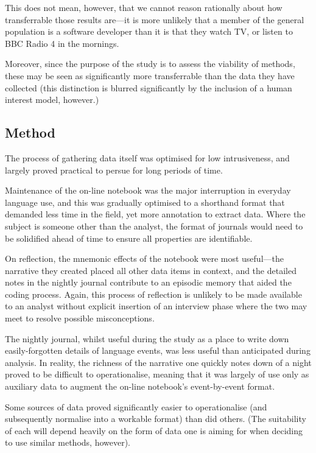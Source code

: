 This does not mean, however, that we cannot reason rationally about how transferrable those results are---it is more unlikely that a member of the general population is a software developer than it is that they watch TV, or listen to BBC Radio 4 in the mornings.

Moreover, since the purpose of the study is to assess the viability of methods, these may be seen as significantly more transferrable than the data they have collected (this distinction is blurred significantly by the inclusion of a human interest model, however.)






\subsection{Method}
The process of gathering data itself was optimised for low intrusiveness, and largely proved practical to persue for long periods of time.

Maintenance of the on-line notebook was the major interruption in everyday language use, and this was gradually optimised to a shorthand format that demanded less time in the field, yet more annotation to extract data.  Where the subject is someone other than the analyst, the format of journals would need to be solidified ahead of time to ensure all properties are identifiable.

On reflection, the mnemonic effects of the notebook were most useful---the narrative they created placed all other data items in context, and the detailed notes in the nightly journal contribute to an episodic memory that aided the coding process.  Again, this process of reflection is unlikely to be made available to an analyst without explicit insertion of an interview phase where the two may meet to resolve possible misconceptions.

The nightly journal, whilst useful during the study as a place to write down easily-forgotten details of language events, was less useful than anticipated during analysis.  In reality, the richness of the narrative one quickly notes down of a night proved to be difficult to operationalise, meaning that it was largely of use only as auxiliary data to augment the on-line notebook's event-by-event format.

Some sources of data proved significantly easier to operationalise (and subsequently normalise into a workable format) than did others.  (The suitability of each will depend heavily on the form of data one is aiming for when deciding to use similar methods, however).

